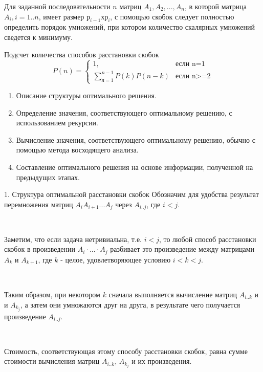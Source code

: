 \documentclass{beamer}
\begin{document}
\begin{frame}[t]
    Для заданной последовательности $n$ матриц $A_1, A_2,...,A_n$, в которой матрица $A_i, i=1..n$, имеет размер $р_{i-1} х р_i$, с помощью скобок следует полностью определить порядок умножений, при котором количество скалярных умножений сведется к минимуму.
    
    \begin{block}{Подсчет количества способов расстановки скобок}
        \begin{equation*}
            P(n) = 
            \begin{cases}
                1, &\text{если n=1}\\
                \sum_{л=1}^{n-1}P(k)P(n-k) &\text{если n>=2}
            \end{cases}
        \end{equation*}
    \end{block}
	\begin{enumerate}
	    \item Описание структуры оптимального решения.
        \item Определение значения, соответствующего оптимальному решению, с использованием рекурсии.
        \item Вычисление значения, соответствующего оптимальному решению, обычно с помощью метода восходящего анализа.
        \item Составление оптимального решения на основе информации, полученной на
предыдущих этапах.
	\end{enumerate}    
\end{frame}

\begin{frame}[t]{1. Структура оптимальной расстановки скобок}
    Обозначим для удобства результат перемножения матриц $A_i A_{i+1}...A_j$ через $A_{i..j}$, где $i < j$. 
    
    ~
    
    Заметим, что если задача нетривиальна, т.е. $i<j$, то любой способ расстановки скобок в произведении $A_i\cdot ... \cdot A_j$ разбивает это произведение между матрицами $A_k$ и $A_{k+1}$, где $k$ - целое, удовлетворяющее условию $i<k<j$.
    
    ~
    
    Таким образом, при некотором $k$ сначала выполняется вычисление матриц $A_{i..k}$ и и $A_{k_j}$, а затем они умножаются друг на друга, в результате чего получается произведение $A_{i..j}$. 
    
    ~
    
    Стоимость, соответствующая этому способу расстановки скобок, равна сумме стоимости вычисления матриц $A_{i..k}$, $A_{k_j}$ и их произведения.    
\end{frame}
\end{document}
